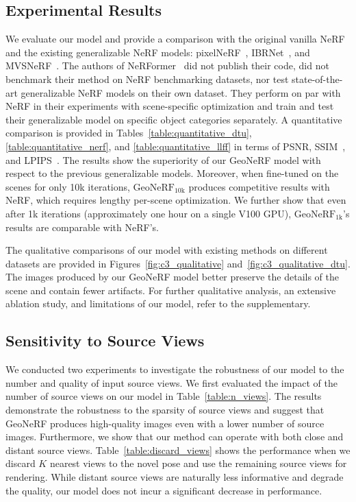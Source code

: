 \subsection{Experimental Results} We evaluate our model and provide a comparison with the original vanilla NeRF~\cite{mildenhall2020nerf} and the existing generalizable NeRF models: pixelNeRF~\cite{yu2021pixelnerf}, IBRNet~\cite{wang2021ibrnet}, and MVSNeRF~\cite{chen2021mvsnerf}. The authors of NeRFormer~\cite{reizenstein2021common} did not publish their code, did not benchmark their method on NeRF benchmarking datasets, nor test state-of-the-art generalizable NeRF models on their own dataset. They perform on par with NeRF in their experiments with scene-specific optimization and train and test their generalizable model on specific object categories separately. A quantitative comparison is provided in Tables~\ref{table:quantitative_dtu}, \ref{table:quantitative_nerf}, and \ref{table:quantitative_llff} in terms of PSNR, SSIM~\cite{wang2004image}, and LPIPS~\cite{zhang2018unreasonable}. The results show the superiority of our GeoNeRF model with respect to the previous generalizable models. Moreover, when fine-tuned on the scenes for only 10k iterations, $\text{GeoNeRF}_{\text{10k}}$ produces competitive results with NeRF, which requires lengthy per-scene optimization. We further show that even after 1k iterations (approximately one hour on a single V100 GPU), $\text{GeoNeRF}_{\text{1k}}$'s results are comparable with NeRF's.

The qualitative comparisons of our model with existing methods on different datasets are provided in Figures~\ref{fig:c3_qualitative} and~\ref{fig:c3_qualitative_dtu}. The images produced by our GeoNeRF model better preserve the details of the scene and contain fewer artifacts. For further qualitative analysis, an extensive ablation study, and limitations of our model, refer to the supplementary.

\subsection{Sensitivity to Source Views} \label{sec:c3_sensitivity}
We conducted two experiments to investigate the robustness of our model to the number and quality of input source views. We first evaluated the impact of the number of source views on our model in Table~\ref{table:n_views}. The results demonstrate the robustness to the sparsity of source views and suggest that GeoNeRF produces high-quality images even with a lower number of source images. Furthermore, we show that our method can operate with both close and distant source views. Table~\ref{table:discard_views} shows the performance when we discard $K$ nearest views to the novel pose and use the remaining source views for rendering. While distant source views are naturally less informative and degrade the quality, our model does not incur a significant decrease in performance.

